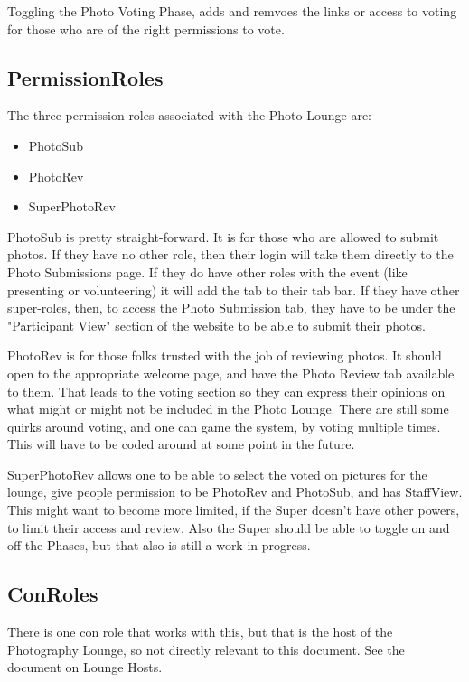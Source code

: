 \documentclass[captions=tablesignature]{scrartcl}
\begin{document}
Toggling the Photo Voting Phase, adds and remvoes the links or
access to voting for those who are of the right permissions to
vote.

\subsection{PermissionRoles}
\label{sec-2-2}
The three permission roles associated with the Photo Lounge are:
\begin{itemize}
\item PhotoSub
\item PhotoRev
\item SuperPhotoRev
\end{itemize}

PhotoSub is pretty straight-forward.  It is for those who are
allowed to submit photos.  If they have no other role, then their
login will take them directly to the Photo Submissions page.  If
they do have other roles with the event (like presenting or
volunteering) it will add the tab to their tab bar.  If they have
other super-roles, then, to access the Photo Submission tab, they
have to be under the "Participant View" section of the website to
be able to submit their photos.

PhotoRev is for those folks trusted with the job of reviewing
photos.  It should open to the appropriate welcome page, and have
the Photo Review tab available to them.  That leads to the voting
section so they can express their opinions on what might or might
not be included in the Photo Lounge.  There are still some quirks
around voting, and one can game the system, by voting multiple
times.  This will have to be coded around at some point in the
future.

SuperPhotoRev allows one to be able to select the voted on pictures
for the lounge, give people permission to be PhotoRev and PhotoSub,
and has StaffView.  This might want to become more limited, if the
Super doesn't have other powers, to limit their access and review.
Also the Super should be able to toggle on and off the Phases, but
that also is still a work in progress.

\subsection{ConRoles}
\label{sec-2-3}
There is one con role that works with this, but that is the host of
the Photography Lounge, so not directly relevant to this document.
See the document on Lounge Hosts.
\end{document}
